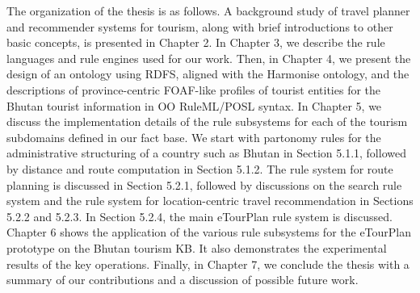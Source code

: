 \hspace{0.3in}The organization of the thesis is as follows.  A background study of travel planner and recommender systems for tourism, along with brief introductions to other basic concepts, is presented in Chapter 2. In Chapter 3, we describe the rule languages and rule engines used for our work. Then, in Chapter 4, we present the design of an ontology using RDFS, aligned with the Harmonise ontology, and the descriptions of province-centric FOAF-like profiles of tourist entities for the Bhutan tourist information in OO RuleML/POSL syntax.  In Chapter 5, we discuss the implementation details of the rule subsystems for each of the tourism subdomains defined in our fact base. We start with partonomy rules for the administrative structuring of a country such as Bhutan in Section 5.1.1, followed by distance and route computation in Section 5.1.2. The rule system for route planning is discussed in Section 5.2.1, followed by discussions on the search rule system and the rule system for location-centric travel recommendation in Sections 5.2.2 and 5.2.3. In Section 5.2.4, the main eTourPlan rule system is discussed. Chapter 6 shows the application of the various rule subsystems for the eTourPlan prototype on the Bhutan tourism KB. It also demonstrates the experimental results of the key operations. Finally, in Chapter 7, we conclude the thesis with a summary of our contributions and a discussion of possible future work.


